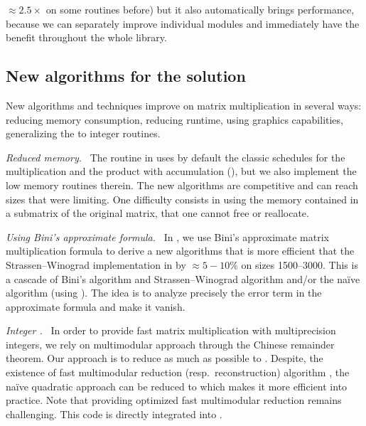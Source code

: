 $\approx 2.5\times$ on some routines before) but it also automatically brings
performance, because we can separately improve individual modules and
immediately have the benefit throughout the whole library.
%
\subsection{New algorithms for the \mul solution}\label{ssec:algmul}
%
New algorithms and techniques improve on matrix multiplication
in several  ways: reducing memory consumption, reducing runtime,
using graphics capabilities, generalizing the \blas to integer
routines.
%
\def\monitem#1{\par \textit{#1}\ }
\monitem{Reduced memory.}
%
The routine \fgemm in \fflas uses by default the classic schedules for the multiplication
and the product with accumulation (\cf \cite{Boyer:2009:sched}), but we also
implement the low memory routines therein. The new algorithms are competitive
and can reach sizes that were limiting.
%
%
One difficulty consists in using the memory contained in a submatrix of
the original matrix, that one cannot free or reallocate.
%
\monitem{Using Bini's approximate formula.}
%
In \cite{BD:2014:Bini}, we use Bini's approximate matrix multiplication formula
to derive a new algorithms that is more efficient that the Strassen--Winograd
implementation in \fgemm by $\approx 5-10\%$ on sizes \num{1500}--\num{3000}.
This is a cascade of Bini's algorithm and Strassen--Winograd algorithm and/or
the naïve algorithm (using \blas). The idea is to analyze precisely the error
term in the approximate formula and make it vanish.
%
\monitem{Integer \blas.}
%
In order to provide fast matrix multiplication with multiprecision integers, we
rely on multimodular approach through the Chinese remainder theorem. Our
approach is to reduce as much as possible to \fgemm. Despite, the existence of
fast multimodular reduction (resp.\ reconstruction) algorithm
\cite{VonzurGathen:1999:MCA}, the naïve quadratic approach can be reduced to
\fgemm which makes it more efficient into practice.  Note that providing
optimized fast multimodular reduction remains challenging. This code is
directly integrated  into \fflas.

